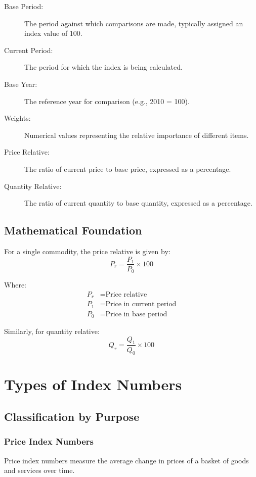 \documentclass[twoside]{book}
\begin{document}
\begin{description}
    \item[Base Period:] The period against which comparisons are made, typically assigned an index value of 100.
    \item[Current Period:] The period for which the index is being calculated.
    \item[Base Year:] The reference year for comparison (e.g., 2010 = 100).
    \item[Weights:] Numerical values representing the relative importance of different items.
    \item[Price Relative:] The ratio of current price to base price, expressed as a percentage.
    \item[Quantity Relative:] The ratio of current quantity to base quantity, expressed as a percentage.
\end{description}

\subsection{Mathematical Foundation}

For a single commodity, the price relative is given by:
\begin{equation}
    P_r = \frac{P_1}{P_0} \times 100
\end{equation}

Where:
\begin{align}
    P_r &= \text{Price relative} \\
    P_1 &= \text{Price in current period} \\
    P_0 &= \text{Price in base period}
\end{align}

Similarly, for quantity relative:
\begin{equation}
    Q_r = \frac{Q_1}{Q_0} \times 100
\end{equation}

\section{Types of Index Numbers}

\subsection{Classification by Purpose}

\subsubsection{Price Index Numbers}
Price index numbers measure the average change in prices of a basket of goods and services over time.
\end{document}
